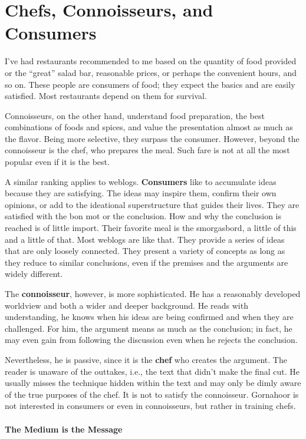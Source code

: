 \section{Chefs, Connoisseurs, and Consumers}

I've had restaurants recommended to me based on the quantity of food provided or the ``great'' salad bar, reasonable prices, or perhaps the convenient hours, and so on. These people are consumers of food; they expect the basics and are easily satisfied. Most restaurants depend on them for survival.

Connoisseurs, on the other hand, understand food preparation, the best combinations of foods and spices, and value the presentation almost as much as the flavor. Being more selective, they surpass the consumer. However, beyond the connoisseur is the chef, who prepares the meal. Such fare is not at all the most popular even if it is the best.

A similar ranking applies to weblogs. \textbf{Consumers} like to accumulate ideas because they are satisfying. The ideas may inspire them, confirm their own opinions, or add to the ideational superstructure that guides their lives. They are satisfied with the bon mot or the conclusion. How and why the conclusion is reached is of little import. Their favorite meal is the smorgasbord, a little of this and a little of that. Most weblogs are like that. They provide a series of ideas that are only loosely connected. They present a variety of concepts as long as they reduce to similar conclusions, even if the premises and the arguments are widely different.

The \textbf{connoisseur}, however, is more sophisticated. He has a reasonably developed worldview and both a wider and deeper background. He reads with understanding, he knows when his ideas are being confirmed and when they are challenged. For him, the argument means as much as the conclusion; in fact, he may even gain from following the discussion even when he rejects the conclusion.

Nevertheless, he is passive, since it is the \textbf{chef} who creates the argument. The reader is unaware of the outtakes, i.e., the text that didn't make the final cut. He usually misses the technique hidden within the text and may only be dimly aware of the true purposes of the chef. It is not to satisfy the connoisseur. Gornahoor is not interested in consumers or even in connoisseurs, but rather in training chefs.

\paragraph{The Medium is the Message}



